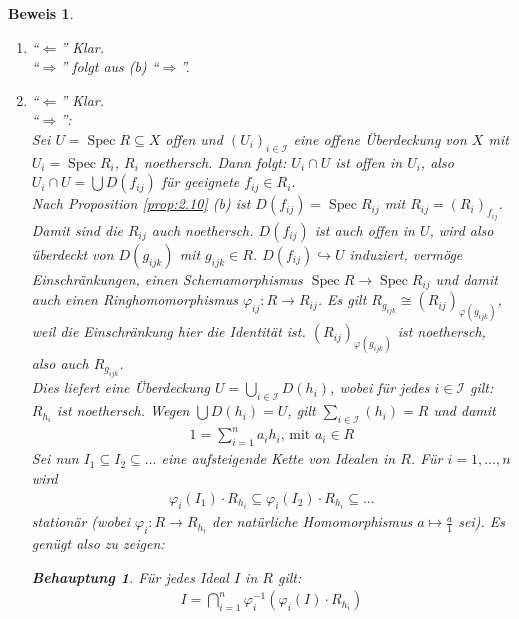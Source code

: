 \documentclass[a4paper,oneside]{scrbook}
\theoremstyle{break}
\theoremstyle{nonumberbreak}
\newtheorem{Beh}{Behauptung}
\theoremstyle{nonumberplain}
\newtheorem{Bew}{Beweis}
\theoremstyle{break}
\newcommand{\Spec}{%
	\ensuremath{\operatorname{Spec}}%
}
\begin{document}
\begin{Bew}
  \begin{enumerate}
  \item[(a)] ``$\Leftarrow$'' Klar. \\
  ``$\Rightarrow$'' folgt aus (b) ``$\Rightarrow$''.
  \item[(b)] ``$\Leftarrow$'' Klar. \\
    ``$\Rightarrow$'': \\
    Sei $U=\Spec R\subseteq X$ offen und $(U_i)_{i\in\mathcal I}$ eine offene Überdeckung von $X$ mit $U_i=\Spec R_i$, $R_i$ noethersch.
    Dann folgt: $U_i\cap U$ ist offen in $U_i$, also $U_i\cap U=\bigcup D(f_{ij})$ für geeignete $f_{ij}\in R_i$. \\
    Nach Proposition \ref{prop:2.10} (b) ist $D(f_{ij})=\Spec R_{ij}$ mit $R_{ij}=(R_i)_{f_{ij}}$. Damit sind die $R_{ij}$ auch noethersch.
    $D(f_{ij})$ ist auch offen in $U$, wird also überdeckt von $D(g_{ijk})$ mit $g_{ijk}\in R$. $D(f_{ij})\hookrightarrow U$ induziert,
    vermöge Einschränkungen, einen Schemamorphismus $\Spec R\to\Spec R_{ij}$ und damit auch einen Ringhomomorphismus $\varphi_{ij}:R\to R_{ij}$.
    Es gilt $ R_{g_{ijk}}\cong (R_{ij})_{\varphi(g_{ijk})}$, weil die Einschränkung hier die Identität ist. $(R_{ij})_{\varphi(g_{ijk})}$ ist noethersch,
    also auch $ R_{g_{ijk}}$. \\
    Dies liefert eine Überdeckung $U=\bigcup_{i\in \mathcal I}D(h_i)$, wobei für jedes $i\in\mathcal I$ gilt: $R_{h_i}$ ist noethersch.
    Wegen $\bigcup D(h_i)=U$, gilt $\sum_{i\in\mathcal I}(h_i)=R$ und damit
    \begin{align*}
      1=\sum^n_{i=1}a_i h_i\text{, mit } a_i\in R
    \end{align*}
    Sei nun $I_1\subseteq I_2\subseteq\dots$ eine aufsteigende Kette von Idealen in $R$.
    Für $i=1,\dots,n$ wird 
    \begin{align*}
      \varphi_i(I_1)\cdot R_{h_i}\subseteq\varphi_i(I_2)\cdot R_{h_i}\subseteq\dots
    \end{align*}
    stationär (wobei $\varphi_i:R\to R_{h_i}$ der natürliche Homomorphismus $a\mapsto \frac{a}{1}$ sei).
    Es genügt also zu zeigen:
    \begin{Beh}
      Für jedes Ideal $I$ in $R$ gilt:
      \begin{align*}
        I=\bigcap_{i=1}^n\varphi_i^{-1}(\varphi_i(I)\cdot R_{h_i})
      \end{align*}
    \end{Beh}
  \end{enumerate}
\end{Bew}
\end{document}
